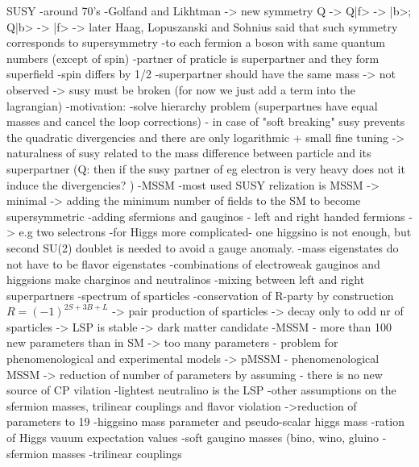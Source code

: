 SUSY
-around 70's
-Golfand and Likhtman -> new symmetry Q -> Q|f> -> |b>; Q|b> -> |f> -> later Haag, Lopuszanski and Sohnius said that such symmetry corresponds to supersymmetry
-to each fermion a boson  with same quantum numbers (except of spin)
-partner of praticle is superpartner and they form superfield
-spin differs by 1/2
-superpartner should have the same mass -> not observed -> susy must be broken (for now we just add a term into the lagrangian)
-motivation:
	-solve hierarchy problem (superpartnes have equal masses and cancel the loop corrections) - in case of "soft breaking" susy prevents the quadratic divergencies and there are only logarithmic + small fine tuning
	-> naturalness of susy related to the mass difference between particle and its superpartner (Q: then if the susy partner of eg electron is very heavy does not it induce the divergencies? )
-MSSM
-most used SUSY relization is MSSM -> minimal -> adding the minimum number of fields to the SM to become supersymmetric
-adding sfermions and gauginos - left and right handed fermions -> e.g two selectrons
-for Higgs more complicated- one higgsino is not enough, but second SU(2) doublet is needed to avoid a gauge anomaly.
-mass eigenstates do not have to be flavor eigenstates
-combinations of electroweak gauginos and higgsions make charginos and neutralinos
-mixing between left and right superpartners 
-spectrum of sparticles
-conservation of R-party by construction $R=(-1)^{2S+3B+L} $
	-> pair production of sparticles
        -> decay only to odd nr of sparticles
        -> LSP is stable -> dark matter candidate
-MSSM - more than 100 new parameters than in SM
-> too many parameters - problem for phenomenological and experimental models
-> pMSSM - phenomenological MSSM -> reduction of number of parameters by assuming
	- there is no new source of CP vilation
	-lightest neutralino is the LSP
	-other assumptions on the sfermion masses, trilinear couplings and flavor violation
	->reduction of parameters to 19
		-higgsino mass parameter and pseudo-scalar higgs mass 
		-ration of Higgs vauum expectation values
		-soft gaugino masses (bino, wino, gluino
		-sfermion masses
		-trilinear couplings

